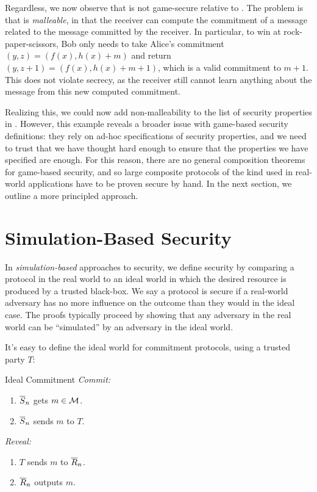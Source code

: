 Regardless, we now observe that  is not
game-secure relative to . The problem is that
 is \emph{malleable}, in that the receiver can compute the
commitment of a message related to the message committed by the receiver. In
particular, to win at rock-paper-scissors, Bob only needs to take Alice's
commitment $(y, z) = (f(x), h(x) + m)$ and return $(y, z+1) = (f(x), h(x) + m +
	1)$, which is a valid commitment to $m+1$. This does not violate secrecy, as the
receiver still cannot learn anything about the message from this new computed
commitment.

Realizing this, we could now add non-malleability to the list of security
properties in . However, this example reveals a
broader issue with game-based security definitions: they rely on ad-hoc
specifications of security properties, and we need to trust that we have thought
hard enough to ensure that the properties we have specified are enough. For this
reason, there are no general composition theorems for game-based security, and
so large composite protocols of the kind used in real-world applications have to
be proven secure by hand. In the next section, we outline a more principled
approach.


\section{Simulation-Based Security}

In \emph{simulation-based} approaches to security, we define security by
comparing a protocol in the real world to an ideal world in which the desired
resource is produced by a trusted black-box. We say a protocol is secure if a
real-world adversary has no more influence on the outcome than they would in the
ideal case. The proofs typically proceed by showing that any adversary in the
real world can be ``simulated'' by an adversary in the ideal world.

It's easy to define the ideal world for commitment protocols, using a trusted
party $T$:

\begin{prot}{Ideal Commitment}\label{prot:ideal commitment}
	\newline
	\emph{Commit:}
	\begin{enumerate}[itemsep=-0.2em,topsep=-0.2em]
		\item ${\overline{S}}_n$ gets $m\in\mathcal{M}$.
		\item ${\overline{S}}_n$ sends $m$ to $T$.
	\end{enumerate}
	\vspace{1em}
	\emph{Reveal:}
	\begin{enumerate}[itemsep=-0.2em,topsep=-0.2em]
		\item $T$ sends $m$ to ${\overline{R}}_n$.
		\item ${\overline{R}}_n$ outputs $m$.
	\end{enumerate}
\end{prot}


